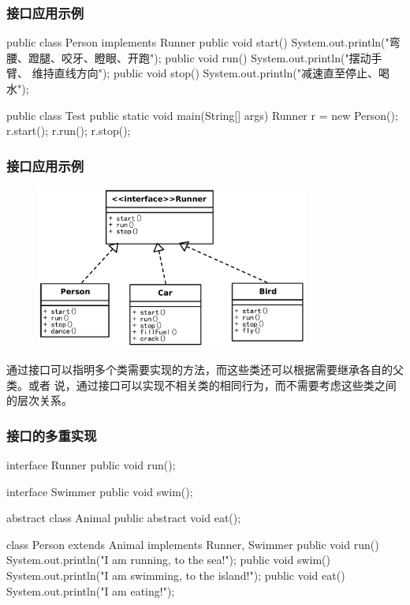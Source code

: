 \documentclass[compress,table]{beamer} %
\def\Mage{\color{magenta}}
\begin{document}
\begin{frame}[fragile] %
\frametitle{接口应用示例}

\begin{javaCode}
public class Person implements Runner {
  public void start() {
    System.out.println("弯腰、蹬腿、咬牙、瞪眼、开跑");
  }
  public void run(){
    System.out.println("摆动手臂、 维持直线方向");
  }
  public void stop(){
    System.out.println("减速直至停止、喝水");
  }
}
\end{javaCode}

\begin{javaCode}
public class Test {
  public static void main(String[] args) {
    Runner r = new Person();
    r.start();
    r.run();
    r.stop();
  }
}
\end{javaCode}
\end{frame}

\begin{frame}[fragile] %
\frametitle{接口应用示例}

\begin{figure}
\centering
\includegraphics[width=0.8\textwidth]{a.pdf}
\end{figure}

通过接口可以指明多个类需要实现的方法，而这些类还可以根据需要继承各自的父类。或者
说，{\Mage 通过接口可以实现不相关类的相同行为，而不需要考虑这些类之间的层次关系。}
\end{frame}

\begin{frame}[fragile] %
\frametitle{接口的多重实现}
\begin{javaCode}
interface Runner {
  public void run();
}
\end{javaCode}

\begin{javaCode}
interface Swimmer {
  public void swim();
}
\end{javaCode}
\begin{javaCode}
abstract class Animal {
  public abstract void eat();
}
\end{javaCode}
\begin{javaCode}
class Person extends Animal implements Runner, Swimmer {
  public void run() {
    System.out.println("I am running, to the sea!");
  }
  public void swim() {
    System.out.println("I am swimming, to the island!");
  }
  public void eat() {
    System.out.println("I am eating!");
  }
}
\end{javaCode}
\end{frame}
\end{document}
